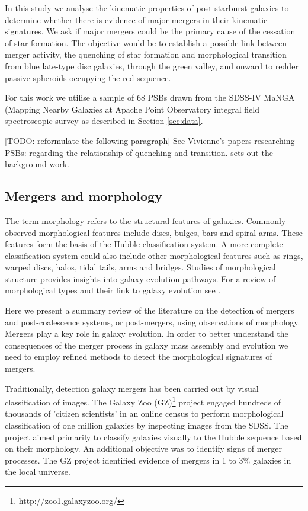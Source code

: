 In this study we analyse the kinematic properties of post-starburst galaxies to determine whether there is evidence of major mergers in their kinematic signatures. We ask if major mergers could be the primary cause of the cessation of star formation. The objective would be to establish a possible link between merger activity, the quenching of star formation and morphological transition from blue late-type disc galaxies, through the green valley, and onward to redder passive spheroids occupying the red sequence.

For this work we utilise a sample of 68 PSBs drawn from the SDSS-IV MaNGA (Mapping Nearby Galaxies at Apache Point Observatory integral field spectroscopic survey  as described in Section \ref{sec:data}.

[TODO: reformulate the following paragraph] See Vivienne's  papers researching PSBs: \citet{2017MNRAS.472.1401A} regarding the relationship of quenching and transition. \citet{2016MNRAS.463..832W} sets out the background work.

\subsection{Mergers and morphology}
\label{sec:mergers}

The term morphology refers to the structural features of galaxies. Commonly observed morphological features include discs, bulges, bars and spiral arms. These features form the basis of the Hubble classification system. A more complete classification system could also include other morphological features such as rings, warped discs, halos, tidal tails, arms and bridges. Studies of  morphological structure provides insights into galaxy evolution pathways. For a review of morphological types and their link to galaxy evolution see \cite{2011arXiv1102.0550B}.

Here we present a summary review of the literature on the detection of mergers and post-coalescence systems, or post-mergers, using observations of morphology. Mergers play a key role in galaxy evolution. In order to better understand the consequences of the merger process in galaxy mass assembly and evolution we need to employ refined methods to detect the morphological signatures of mergers.

Traditionally, detection galaxy mergers has been carried out by visual classification of images. The Galaxy Zoo (GZ)\footnote{http://zoo1.galaxyzoo.org/} project \citet{10.1111/j.1365-2966.2008.13689.x,10.1111/j.1365-2966.2010.17432.x, 2017MNRAS.464.4176W} engaged hundreds of thousands of 'citizen scientists' in an online census to perform morphological classification of one million galaxies by inspecting images from the SDSS. The project aimed primarily to classify galaxies visually to the Hubble sequence based on their morphology. An additional objective was to identify signs of merger processes. The GZ project identified evidence of mergers in 1 to 3\% galaxies in the local universe.

